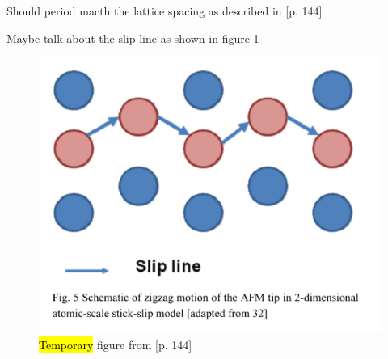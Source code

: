 









Should period macth the lattice spacing as described in \cite{kim_nano-scale_2009}[p. 144]



Maybe talk about the slip line as shown in figure \ref{fig:slip_line}


\begin{figure}[H]
  \centering
  \includegraphics[width=0.5\linewidth]{figures/theory/slip_line.png}
  \caption{\hl{Temporary} figure from \cite{kim_nano-scale_2009}[p. 144]}
  \label{fig:slip_line}
\end{figure}

